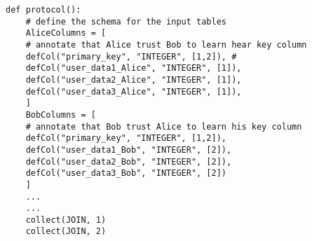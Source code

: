 \begin{lstlisting}[caption={ The Python protocol of Conclave for our last use case    }]
	def protocol():
	# define the schema for the input tables 
	AliceColumns = [
	# annotate that Alice trust Bob to learn hear key column
	defCol("primary_key", "INTEGER", [1,2]), #
	defCol("user_data1_Alice", "INTEGER", [1]),
	defCol("user_data2_Alice", "INTEGER", [1]),
	defCol("user_data3_Alice", "INTEGER", [1]),
	]
	BobColumns = [
	# annotate that Bob trust Alice to learn his key column
	defCol("primary_key", "INTEGER", [1,2]),
	defCol("user_data1_Bob", "INTEGER", [2]),
	defCol("user_data2_Bob", "INTEGER", [2]),
	defCol("user_data3_Bob", "INTEGER", [2])
	]
	...
	...
	collect(JOIN, 1)
	collect(JOIN, 2)
\end{lstlisting}



